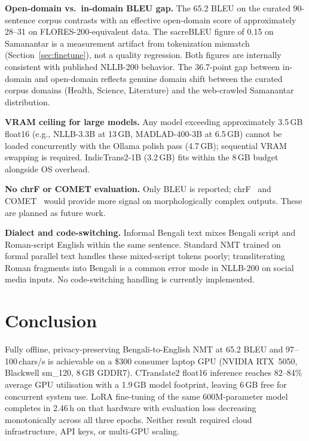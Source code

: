 \documentclass[journal]{IEEEtran}
\newcommand{\TRAINDURATION}{2.46\,h}
\begin{document}
\textbf{Open-domain vs.\ in-domain BLEU gap.}
The 65.2 BLEU on the curated 90-sentence corpus contrasts with an effective
open-domain score of approximately 28--31 on FLORES-200-equivalent data.
The sacreBLEU figure of 0.15 on Samanantar is a measurement artifact from
tokenization mismatch (Section~\ref{sec:finetune}), not a quality regression.
Both figures are internally consistent with published NLLB-200 behavior.
The 36.7-point gap between in-domain and open-domain reflects genuine domain
shift between the curated corpus domains (Health, Science, Literature) and the
web-crawled Samanantar distribution.

\textbf{VRAM ceiling for large models.}
Any model exceeding approximately 3.5\,GB float16 (e.g., NLLB-3.3B at 13\,GB,
MADLAD-400-3B at 6.5\,GB) cannot be loaded concurrently with the Ollama polish
pass (4.7\,GB); sequential VRAM swapping is required.
IndicTrans2-1B (3.2\,GB) fits within the 8\,GB budget alongside OS overhead.

\textbf{No chrF or COMET evaluation.}
Only BLEU is reported; chrF~\cite{popovic2015chrf} and COMET~\cite{rei2020comet}
would provide more signal on morphologically complex outputs.
These are planned as future work.

\textbf{Dialect and code-switching.}
Informal Bengali text mixes Bengali script and Roman-script English within the
same sentence.
Standard NMT trained on formal parallel text handles these mixed-script tokens
poorly; transliterating Roman fragments into Bengali is a common error mode in
NLLB-200 on social media inputs.
No code-switching handling is currently implemented.

\section{Conclusion}
\label{sec:conclusion}

Fully offline, privacy-preserving Bengali-to-English NMT at 65.2 BLEU and
97--100\,chars/s is achievable on a \$300 consumer laptop GPU (NVIDIA RTX~5050,
Blackwell sm\_120, 8\,GB GDDR7).
CTranslate2 float16 inference reaches 82--84\% average GPU utilisation with a
1.9\,GB model footprint, leaving 6\,GB free for concurrent system use.
LoRA fine-tuning of the same 600M-parameter model completes in \TRAINDURATION{}
on that hardware with evaluation loss decreasing monotonically across all three
epochs.
Neither result required cloud infrastructure, API keys, or multi-GPU scaling.
\end{document}
